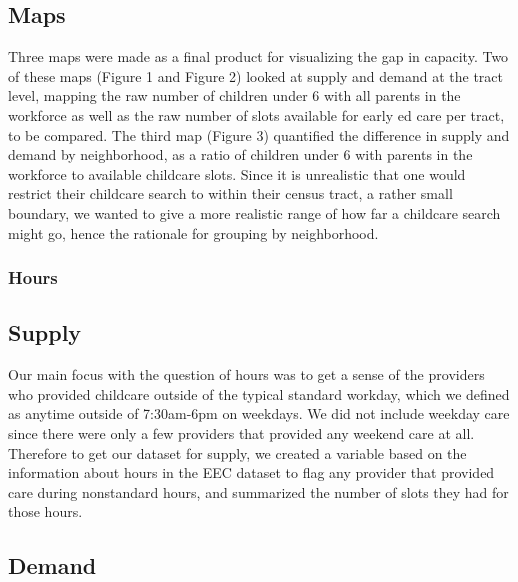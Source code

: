 \documentclass[10pt,letterpaper]{article}
\begin{document}
\subsection{Maps}\label{maps}

Three maps were made as a final product for visualizing the gap in
capacity. Two of these maps (Figure 1 and Figure 2) looked at supply and
demand at the tract level, mapping the raw number of children under 6
with all parents in the workforce as well as the raw number of slots
available for early ed care per tract, to be compared. The third map
(Figure 3) quantified the difference in supply and demand by
neighborhood, as a ratio of children under 6 with parents in the
workforce to available childcare slots. Since it is unrealistic that one
would restrict their childcare search to within their census tract, a
rather small boundary, we wanted to give a more realistic range of how
far a childcare search might go, hence the rationale for grouping by
neighborhood.

\subsubsection{Hours}\label{hours}

\subsection{Supply}\label{supply-1}

Our main focus with the question of hours was to get a sense of the
providers who provided childcare outside of the typical standard
workday, which we defined as anytime outside of 7:30am-6pm on weekdays.
We did not include weekday care since there were only a few providers
that provided any weekend care at all. Therefore to get our dataset for
supply, we created a variable based on the information about hours in
the EEC dataset to flag any provider that provided care during
nonstandard hours, and summarized the number of slots they had for those
hours.

\subsection{Demand}\label{demand-1}
\end{document}
